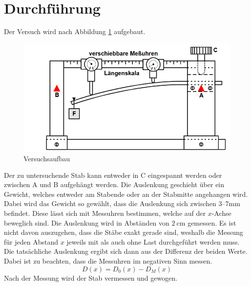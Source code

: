 \section{Durchführung}
Der Versuch wird nach Abbildung \ref{fig:aufbau} aufgebaut.
\begin{figure}
    \centering
    \includegraphics[width=\textwidth]{content/aufbau.png}
    \caption{Versuchsaufbau}
    \label{fig:aufbau}
\end{figure}
\noindent Der zu untersuchende Stab kann entweder in C eingespannt werden oder zwischen A und B 
aufgehängt werden.
Die Auslenkung geschieht über ein Gewicht, welches entweder am Stabende oder an der Stabmitte 
angehangen wird.
Dabei wird das Gewicht so gewählt, dass die Auslenkung sich zwischen $3$--$7\si{\milli\meter}$ 
befindet.
Diese lässt sich mit Messuhren bestimmen, welche auf der $x$-Achse beweglich sind.
Die Auslenkung wird in Abständen von $\SI{2}{\centi\meter}$ gemessen.
Es ist nicht davon auszugehen, dass die Stäbe exakt gerade sind, weshalb die Messung für 
jeden Abstand $x$ jeweils mit als auch ohne Last durchgeführt werden muss.
Die tatsächliche Auslenkung ergibt sich dann aus der Differenz der beiden Werte.
Dabei ist zu beachten, dass die Messuhren im negativen Sinn messen.
\begin{equation}
  D(x)=D_0(x) - D_M(x)
\end{equation}
Nach der Messung wird der Stab vermessen und gewogen.
